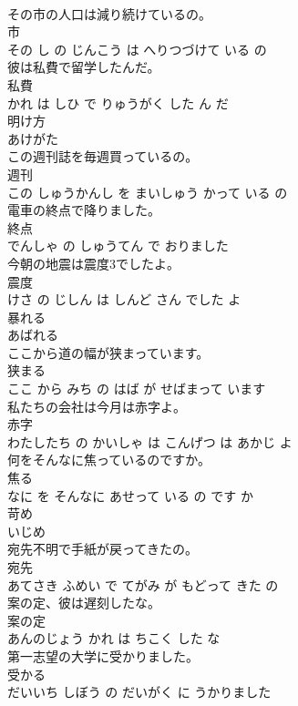 \documentclass[8pt]{extreport}
\begin{document}
\begin{CJK}{UTF8}{min}
\\	その市の人口は減り続けているの。	
\\	市 
\\	その し の じんこう は へりつづけて いる の			
\\	彼は私費で留学したんだ。	
\\	私費 
\\	かれ は しひ で りゅうがく した ん だ			
\\	明け方	
\\	あけがた			
\\	この週刊誌を毎週買っているの。	
\\	週刊 
\\	この しゅうかんし を まいしゅう かって いる の			
\\	電車の終点で降りました。	
\\	終点 
\\	でんしゃ の しゅうてん で おりました			
\\	今朝の地震は震度3でしたよ。	
\\	震度 
\\	けさ の じしん は しんど さん でした よ			
\\	暴れる	
\\	あばれる			
\\	ここから道の幅が狭まっています。	
\\	狭まる 
\\	ここ から みち の はば が せばまって います			
\\	私たちの会社は今月は赤字よ。	
\\	赤字 
\\	わたしたち の かいしゃ は こんげつ は あかじ よ			
\\	何をそんなに焦っているのですか。	
\\	焦る 
\\	なに を そんなに あせって いる の です か			
\\	苛め	
\\	いじめ			
\\	宛先不明で手紙が戻ってきたの。	
\\	宛先 
\\	あてさき ふめい で てがみ が もどって きた の			
\\	案の定、彼は遅刻したな。	
\\	案の定 
\\	あんのじょう かれ は ちこく した な			
\\	第一志望の大学に受かりました。	
\\	受かる 
\\	だいいち しぼう の だいがく に うかりました			

\end{CJK}
\end{document}
